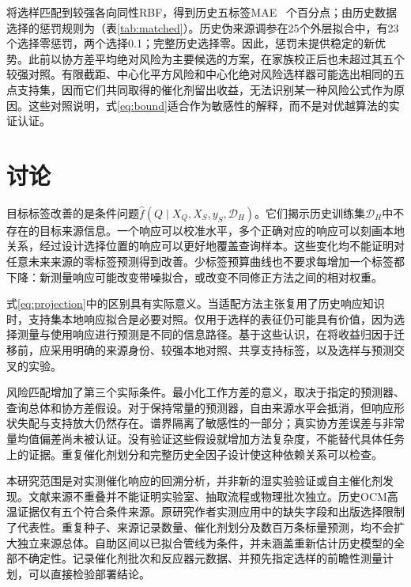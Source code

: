 \documentclass[11pt]{article}
\begin{document}
将选样匹配到较强各向同性RBF，得到历史五标签MAE \RbfMatchMae\ 个百分点；由历史数据选择的惩罚规则为\RobustMae{}（表\ref{tab:matched}）。历史伪来源调参在25个外层拟合中，有23个选择零惩罚，两个选择0.1；完整历史选择零。因此，惩罚未提供稳定的新优势。此前以协方差平均绝对风险为主要候选的方案，在家族校正后也未超过其五个较强对照。有限截距、中心化平方风险和中心化绝对风险选样器可能选出相同的五点支持集，因而它们共同取得的催化剂留出收益，无法识别某一种风险公式作为原因。这些对照说明，式\ref{eq:bound}适合作为敏感性的解释，而不是对优越算法的实证认证。
\begin{table}[htbp]\centering\small
\caption{固定较强RBF、五标签和22个符合条件来源下的历史随机查询F1比较。工作风险是无量纲代理量，并不是以百分点计的实际MAE估计。}\label{tab:matched}

\end{table}

\section{讨论}
目标标签改善的是条件问题$\widehat f(Q\mid X_Q,X_S,y_S,\mathcal D_H)$。它们揭示历史训练集$\mathcal D_H$中不存在的目标来源信息。一个响应可以校准水平，多个正确对应的响应可以刻画本地关系，经过设计选择位置的响应可以更好地覆盖查询样本。这些变化均不能证明对任意未来来源的零标签预测得到改善。少标签预算曲线也不要求每增加一个标签都下降：新测量响应可能改变带噪拟合，或改变不同修正方法之间的相对权重。

式\ref{eq:projection}中的区别具有实际意义。当适配方法主张复用了历史响应知识时，支持集本地响应拟合是必要对照。仅用于选样的表征仍可能具有价值，因为选择测量与使用响应进行预测是不同的信息路径。基于这些认识，在将收益归因于迁移前，应采用明确的来源身份、较强本地对照、共享支持标签，以及选样与预测交叉的实验。

风险匹配增加了第三个实际条件。最小化工作方差的意义，取决于指定的预测器、查询总体和协方差假设。对于保持常量的预测器，自由来源水平会抵消，但响应形状失配与支持放大仍然存在。谱界隔离了敏感性的一部分；真实协方差误差与非常量均值偏差尚未被认证。没有验证这些假设就增加方法复杂度，不能替代具体任务上的证据。重复催化剂划分和完整历史全因子设计使这种依赖关系可以检查。

本研究范围是对实测催化响应的回溯分析，并非新的湿实验验证或自主催化剂发现。文献来源不重叠并不能证明实验室、抽取流程或物理批次独立。历史OCM高温证据仅有五个符合条件来源。原研究作者实测应用中的缺失字段和出版选择限制了代表性。重复种子、来源记录数量、催化剂划分及数百万条标量预测，均不会扩大独立来源总体。自助区间以已拟合管线为条件，并未涵盖重新估计历史模型的全部不确定性。记录催化剂批次和反应器元数据、并预先指定选样的前瞻性测量计划，可以直接检验部署结论。
\end{document}
